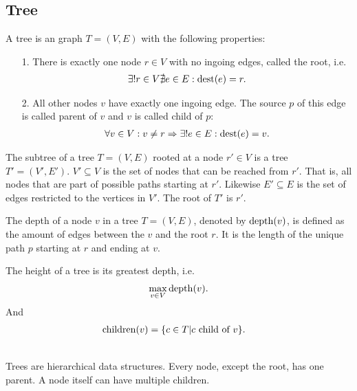 \subsection{Tree}
	\begin{mydef}\label{tree}
		A \textnormal{tree} is an graph $T = (V, E)$ with the following properties:
		\begin{itemize}
			\item[1.] There is exactly one node $r \in V$ with no ingoing edges, called the \textnormal{root}, i.e.
				\begin{align*}
					\exists! r \in V \nexists e \in E : \operatorname{dest}(e) = r.
				\end{align*}
			\item[2.] All other nodes $v$ have exactly one ingoing edge. The source $p$ of this edge is called \textnormal{parent} of $v$ and
				$v$ is called \textnormal{child} of $p$:
				\begin{align*}
					\forall v \in V : v \neq r \Rightarrow \exists! e \in E : \operatorname{dest}(e) = v.
				\end{align*}
		\end{itemize}
	\end{mydef}
	\begin{mydef}\label{subTree}
		The \textnormal{subtree} of a tree $T = (V, E)$ rooted at a node $r' \in V$ is a tree $T' = (V', E')$. $V' \subseteq V$ is the set
		of nodes that can be reached from $r'$. That is, all nodes that are part of possible paths starting at $r'$.
		Likewise $E' \subseteq E$ is the set of edges restricted to the vertices in $V'$. The root of $T'$ is $r'$.
	\end{mydef}
	\begin{mydef}\label{treeDepth}
		The \textnormal{depth} of a node $v$ in a tree $T = (V, E)$, denoted by $\operatorname{depth}(v)$, is defined as the amount of
		edges between the $v$ and the root $r$. It is the length of the unique path $p$ starting at $r$ and ending at $v$.
		
		The \textnormal{height} of a tree is its greatest depth, i.e.
		\begin{align*}
			\max_{v \in V} \operatorname{depth}(v).
		\end{align*}
		And
		\begin{align*}
			\operatorname{children}(v)	&= \{c \in T | c \text{ child of } v\}.
		\end{align*}
	\end{mydef}\quad\\
	Trees are hierarchical data structures. Every node, except the root, has one parent. A node itself can have multiple children.
